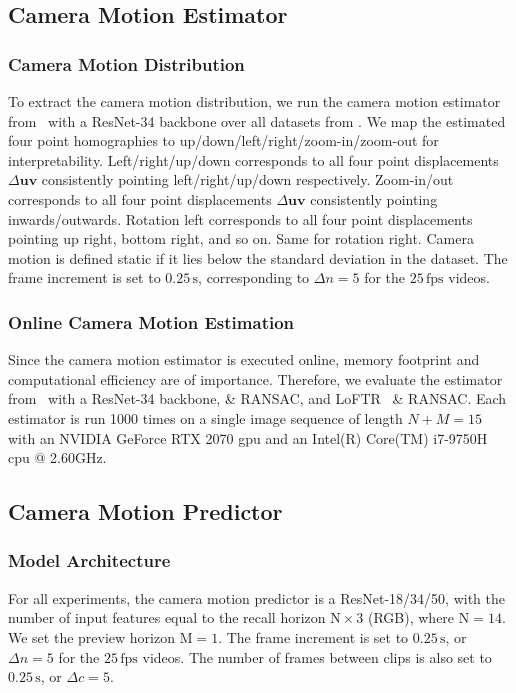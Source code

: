 \subsection{Camera Motion Estimator}
\label{c4:sec:camera_motion_estimator}
\subsubsection{Camera Motion Distribution} 
To extract the camera motion distribution, we run the camera motion estimator from~\cite{huber2022deep} with a ResNet-34 backbone over all datasets from . We map the estimated four point homographies to up/down/left/right/zoom-in/zoom-out for interpretability. Left/right/up/down corresponds to all four point displacements $\Delta\mathbf{uv}$ consistently pointing left/right/{\allowbreak}up/down respectively.
Zoom-in/out corresponds to all four point displacements $\Delta\mathbf{uv}$ consistently pointing inwards/outwards. Rotation left corresponds to all four point displacements pointing up right, bottom right, and so on. Same for rotation right. Camera motion is defined static if it lies below the standard deviation in the dataset. The frame increment is set to $0.25\,\text{s}$, corresponding to $\Delta n = 5$ for the $25\,\text{fps}$ videos.

\subsubsection{Online Camera Motion Estimation}
\label{c4:sec:online_camera_motion_estimation}
Since the camera motion estimator is executed online, memory footprint and computational efficiency are of importance. Therefore, we evaluate the estimator from~\cite{huber2022deep} with a ResNet-34 backbone,  \& RANSAC, and LoFTR~\cite{sun2021loftr} \& RANSAC. Each estimator is run 1000 times on a single image sequence of length $N+M=15$ with an NVIDIA GeForce RTX 2070 \gls{gpu} and an Intel(R) Core(TM) i7-9750H \gls{cpu} @ 2.60GHz.

\subsection{Camera Motion Predictor}
\label{c4:sec:camera_motion_predictor_experiments}
\subsubsection{Model Architecture}
\label{c4:sec:model_architecture}
For all experiments, the camera motion predictor is a ResNet-18/34/50, with the number of input features equal to the recall horizon $\text{N}\times3$ (RGB), where $\text{N}=14$. We set the preview horizon $\text{M}=1$. The frame increment is set to $0.25\,\text{s}$, or $\Delta n = 5$ for the $25\,\text{fps}$ videos. The number of frames between clips is also set to $0.25\,\text{s}$, or $\Delta c = 5$.

